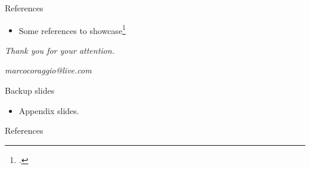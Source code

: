 \documentclass{lib/SMbeamer}
\begin{document}
\begin{frame}{References}
  \begin{itemize}
    \item Some references to showcase\footcitespace\footcite{smith2024interesting}
  \end{itemize}
\end{frame}

\begin{frameNoTitle}
  \centering%
  \textit{Thank you for your attention.}
  
  {\small \color{colorAccentLight}\textit{marcocoraggio@live.com}}
\end{frameNoTitle}


\appendix

\begin{frame}{Backup slides}
  \begin{itemize}
    \item Appendix slides.
  \end{itemize}
\end{frame}

\begin{frame}[allowframebreaks]{References}
  \printbibliography[heading=none]
\end{frame}
\end{document}
